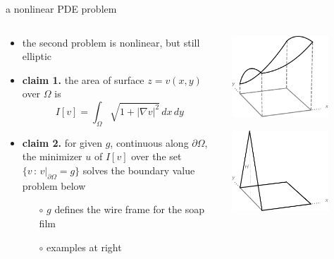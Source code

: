 \documentclass[10pt,
               svgnames,
               hyperref={colorlinks,citecolor=DeepPink4,linkcolor=FireBrick,urlcolor=Maroon},
               usepdftitle=false]{beamer}
\newcommand{\grad}{\nabla}
\begin{document}
\begin{frame}{a nonlinear PDE problem}

\begin{columns}
\begin{column}{0.7\textwidth}
\begin{itemize}
\item the second problem is nonlinear, but still elliptic
\item \textbf{claim 1.} the area of surface $z=v(x,y)$ over $\Omega$ is
    $$I[v] = \int_\Omega \sqrt{1 + |\grad v|^2}\,dx\,dy$$
\item \textbf{claim 2.} for given $g$, continuous along $\partial\Omega$, the minimizer $u$ of $I[v]$ over the set $\{v \,:\, v\big|_{\partial \Omega} = g\}$ solves the boundary value problem below
    \begin{itemize}
    \item[$\circ$] $g$ defines the wire frame for the soap film
    \item[$\circ$] examples at right
    \end{itemize}
\end{itemize}
\end{column}
\begin{column}{0.3\textwidth}
\hfill \includegraphics[width=0.75\textwidth]{images/catenary.png}

\hfill \includegraphics[width=0.75\textwidth]{images/tent.png}
\end{column}
\end{columns}


\end{frame}
\end{document}
